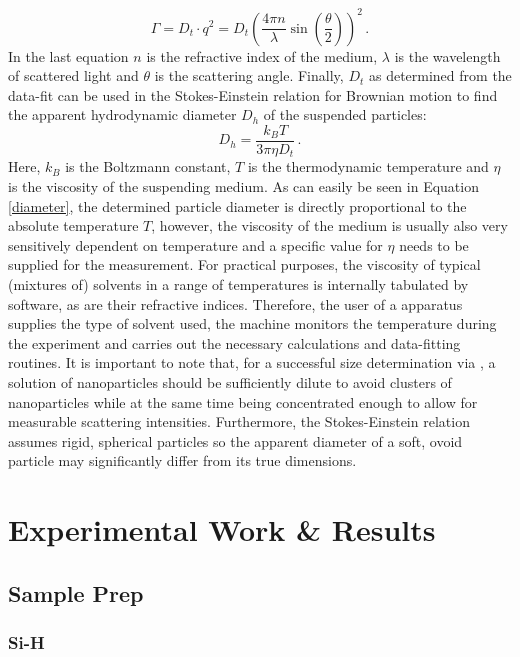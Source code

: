 \begin{equation}
	\Gamma = D_t \cdot q^2 = D_t \left( \frac{4 \pi n}{\lambda} \sin \left( \frac{\theta}{2} \right) \right) ^2 \, .
\end{equation}
In the last equation $n$ is the refractive index of the medium, $\lambda$ is the wavelength of scattered light and $\theta$ is the scattering angle. Finally, $D_t$ as determined from the data-fit can be used in the Stokes-Einstein relation for Brownian motion to find the apparent hydrodynamic diameter $D_h$ of the suspended particles:
\begin{equation}
\label{diameter}
	D_h = \frac{k_B T}{3\pi \eta D_t} \, .
\end{equation}
Here, $k_B$ is the Boltzmann constant, $T$ is the thermodynamic temperature and $\eta$ is the viscosity of the suspending medium. As can easily be seen in Equation \eqref{diameter}, the determined particle diameter is directly proportional to the absolute temperature $T$, however, the viscosity of the medium is usually also very sensitively dependent on temperature and a specific value for $\eta$ needs to be supplied for the measurement. For practical purposes, the viscosity of typical (mixtures of) solvents in a range of temperatures is internally tabulated by software, as are their refractive indices. Therefore, the user of a \dls{} apparatus supplies the type of solvent used, the machine monitors the temperature during the experiment and carries out the necessary calculations and data-fitting routines. It is important to note that, for a successful size determination via \dls{}, a solution of nanoparticles should be sufficiently dilute to avoid clusters of nanoparticles while at the same time being concentrated enough to allow for measurable scattering intensities. Furthermore, the Stokes-Einstein relation assumes rigid, spherical particles so the apparent diameter of a soft, ovoid particle may significantly differ from its true dimensions.

\section{Experimental Work \& Results}
\subsection{Sample Prep}
\subsubsection{Si-H}
